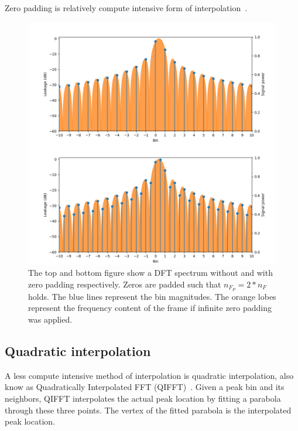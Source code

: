 \documentclass[a4paper,10pt,twocolumn]{article}
\begin{document}
Zero padding is relatively compute intensive form of interpolation~\cite{interpolnozero}. %
\begin{figure}[h]
    \centering
    \includegraphics[width=\linewidth]{fig/zero_pad_interpolate.png}
    \caption{The top and bottom figure show a DFT spectrum without and with zero padding respectively. Zeros are padded such that $n_{F_P} = 2 * n_F$ holds. The blue lines represent the bin magnitudes. The orange lobes represent the frequency content of the frame if infinite zero padding was applied.}
    \label{fig:visualpadding}
\end{figure}


\subsection{Quadratic interpolation}  \label{sub:qifft}
A less compute intensive method of interpolation is quadratic interpolation, also know as Quadratically Interpolated FFT (QIFFT)~\cite{interpolnozero}. Given a peak bin and its neighbors, QIFFT interpolates the actual peak location by fitting a parabola through these three points. The vertex of the fitted parabola is the interpolated peak location.
\end{document}
